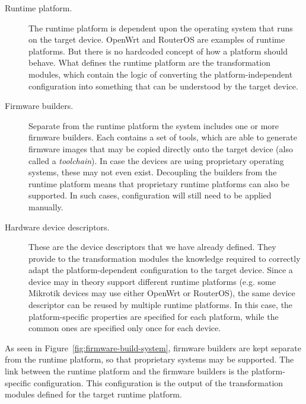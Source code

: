 \documentclass[5p,sort&compress]{elsarticle}
\begin{document}
\begin{description}
    \item[Runtime platform.] The runtime platform is dependent upon the operating system that runs on the target device.
    OpenWrt and RouterOS are examples of runtime platforms.
    But there is no hardcoded concept of how a platform should behave.
    What defines the runtime platform are the transformation modules, which contain the logic of converting the platform-independent configuration into something that can be understood by the target device.

    \item[Firmware builders.] Separate from the runtime platform the system includes one or more firmware builders.
    Each contains a set of tools, which are able to generate firmware images that may be copied directly onto the target device (also called a {\em toolchain}).
    In case the devices are using proprietary operating systems, these may not even exist.
    Decoupling the builders from the runtime platform means that proprietary runtime platforms can also be supported.
    In such cases, configuration will still need to be applied manually.

    \item[Hardware device descriptors.] These are the device descriptors that we have already defined.
    They provide to the transformation modules the knowledge required to correctly adapt the platform-dependent configuration to the target device.
    Since a device may in theory support different runtime platforms (e.g. some Mikrotik devices may use either OpenWrt or RouterOS), the same device descriptor can be reused by multiple runtime platforms.
    In this case, the platform-specific properties are specified for each platform, while the common ones are specified only once for each device.
\end{description}

As seen in Figure~\ref{fig:firmware-build-system}, firmware builders are kept separate from the runtime platform, so that proprietary systems may be supported.
The link between the runtime platform and the firmware builders is the platform-specific configuration.
This configuration is the output of the transformation modules defined for the target runtime platform.
\end{document}
